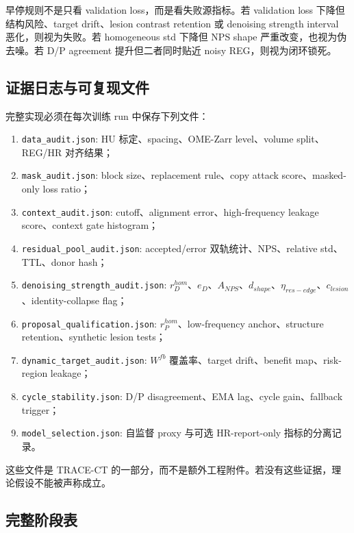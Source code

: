 \documentclass[11pt,a4paper,UTF8,fontset=fandol]{ctexart}
\theoremstyle{definition}
\begin{document}
早停规则不是只看 validation loss，而是看失败源指标。若 validation loss 下降但结构风险、target drift、lesion contrast retention 或 denoising strength interval 恶化，则视为失败。若 homogeneous std 下降但 NPS shape 严重改变，也视为伪去噪。若 D/P agreement 提升但二者同时贴近 noisy REG，则视为闭环锁死。

\subsection{证据日志与可复现文件}

完整实现必须在每次训练 run 中保存下列文件：
\begin{enumerate}
    \item \texttt{data\_audit.json}: HU 标定、spacing、OME-Zarr level、volume split、REG/HR 对齐结果；
    \item \texttt{mask\_audit.json}: block size、replacement rule、copy attack score、masked-only loss ratio；
    \item \texttt{context\_audit.json}: cutoff、alignment error、high-frequency leakage score、context gate histogram；
    \item \texttt{residual\_pool\_audit.json}: accepted/error 双轨统计、NPS、relative std、TTL、donor hash；
    \item \texttt{denoising\_strength\_audit.json}: $r_D^{hom}$、$e_D$、$A_{NPS}$、$d_{shape}$、$\eta_{res-edge}$、$c_{lesion}$、identity-collapse flag；
    \item \texttt{proposal\_qualification.json}: $r_P^{hom}$、low-frequency anchor、structure retention、synthetic lesion tests；
    \item \texttt{dynamic\_target\_audit.json}: $W^{fb}$ 覆盖率、target drift、benefit map、risk-region leakage；
    \item \texttt{cycle\_stability.json}: D/P disagreement、EMA lag、cycle gain、fallback trigger；
    \item \texttt{model\_selection.json}: 自监督 proxy 与可选 HR-report-only 指标的分离记录。
\end{enumerate}

这些文件是 TRACE-CT 的一部分，而不是额外工程附件。若没有这些证据，理论假设不能被声称成立。

\subsection{完整阶段表}
\end{document}
